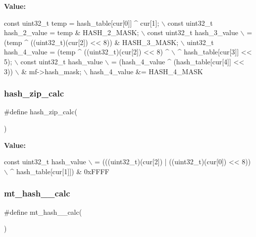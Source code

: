 {\bfseries Value\+:}
\begin{DoxyCode}
\textcolor{keyword}{const} uint32\_t temp = hash\_table[cur[0]] ^ cur[1]; \(\backslash\)
        const uint32\_t hash\_2\_value = temp & HASH\_2\_MASK; \(\backslash\)
        const uint32\_t hash\_3\_value \(\backslash\)
                        = (temp ^ ((uint32\_t)(cur[2]) << 8)) & HASH\_3\_MASK; \(\backslash\)
        uint32\_t hash\_4\_value = (temp ^ ((uint32\_t)(cur[2]) << 8) ^ \(\backslash\)
                        ^ hash\_table[cur[3]] << 5); \(\backslash\)
        const uint32\_t hash\_value \(\backslash\)
                        = (hash\_4\_value ^ (hash\_table[cur[4]] << 3)) \(\backslash\)
                                & mf->hash\_mask; \(\backslash\)
        hash\_4\_value &= HASH\_4\_MASK
\end{DoxyCode}
\mbox{\label{lz__encoder__hash_8h_a4245a8cb3f28493d7d4bbc82f9c6864b}} 
\subsubsection{hash\+\_\+zip\+\_\+calc}
{\footnotesize\ttfamily \#define hash\+\_\+zip\+\_\+calc(\begin{DoxyParamCaption}{ }\end{DoxyParamCaption})}

{\bfseries Value\+:}
\begin{DoxyCode}
\textcolor{keyword}{const} uint32\_t hash\_value \(\backslash\)
                        = (((uint32\_t)(cur[2]) | ((uint32\_t)(cur[0]) << 8)) \(\backslash\)
                                ^ hash\_table[cur[1]]) & 0xFFFF
\end{DoxyCode}
\mbox{\label{lz__encoder__hash_8h_a67cca00eb05b03028048d4afb63a8953}} 
\subsubsection{mt\+\_\+hash\+\_\+\_\+calc}
{\footnotesize\ttfamily \#define mt\+\_\+hash\+\_\+\_\+calc(\begin{DoxyParamCaption}{ }\end{DoxyParamCaption})}

